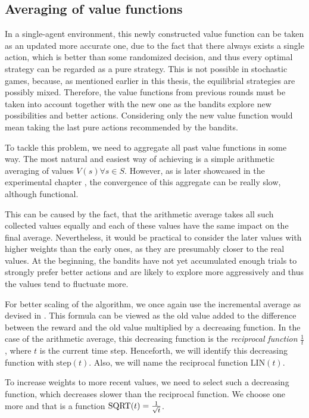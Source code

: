 \documentclass[../main.tex]{subfiles}
\begin{document}
\subsection{Averaging of value functions}\label{new:bandititeration:avg}
In a single-agent environment, this newly constructed value function can be taken as an updated more accurate one, due to the fact that there always exists a single action, which is better than some randomized decision, and thus every optimal strategy can be regarded as a pure strategy.
This is not possible in stochastic games, because, as mentioned earlier in this thesis, the equilibrial strategies are possibly mixed.
Therefore, the value functions from previous rounds must be taken into account together with the new one as the bandits explore new possibilities and better actions.
Considering only the new value function would mean taking the last pure actions recommended by the bandits.

To tackle this problem, we need to aggregate all past value functions in some way.
The most natural and easiest way of achieving is a simple arithmetic averaging of values $V(s) \forall s \in S$.
However, as is later showcased in the experimental chapter , the convergence of this aggregate can be really slow, although functional.

This can be caused by the fact, that the arithmetic average takes all such collected values equally and each of these values have the same impact on the final average.
Nevertheless, it would be practical to consider the later values with higher weights than the early ones, as they are presumably closer to the real values.
At the beginning, the bandits have not yet accumulated enough trials to strongly prefer better actions and are likely to explore more aggressively and thus the values tend to fluctuate more.

For better scaling of the algorithm, we once again use the incremental average as devised in .
This formula can be viewed as the old value added to the difference between the reward and the old value multiplied by a decreasing function.
In the case of the arithmetic average, this decreasing function is the \textit{reciprocal function} $\frac{1}{t}$, where $t$ is the current time step.
Henceforth, we will identify this decreasing function with $\text{step}(t)$.
Also, we will name the reciprocal function $\text{LIN}(t)$.

To increase weights to more recent values, we need to select such a decreasing function, which decreases slower than the reciprocal function.
We choose one more and that is a function $\text{SQRT}(t) = \frac{1}{\sqrt{t}}$.
\end{document}
